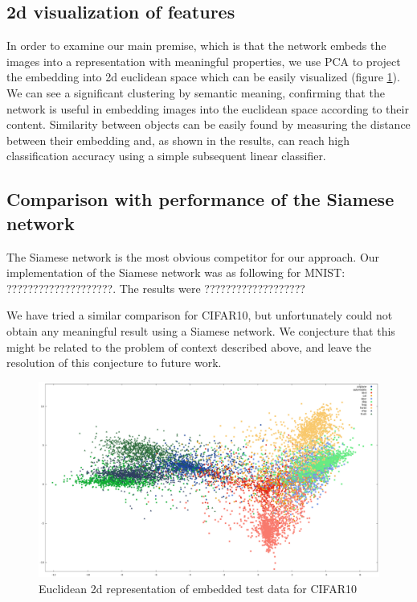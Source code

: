 \documentclass{article} %
\begin{document}
\subsection{2d visualization of features}
In order to examine our main premise, which is that the network embeds the images into a representation with meaningful properties, we
use PCA to project the embedding into 2d euclidean space which can be easily visualized (figure \ref{EuclideanRepresentation}).
We can see a significant clustering by semantic meaning, confirming that the network is useful in embedding
images into the euclidean space according to their content. 
 Similarity between objects can be easily found by  measuring the distance between their embedding and, as shown in the results, can reach high
classification accuracy using a simple subsequent linear classifier. 

\subsection{Comparison with performance of the Siamese network}
The Siamese network is the most obvious competitor for our approach.  Our implementation of the Siamese network was as following for MNIST:    ????????????????????.   The results were ??????????????????? 

We have tried a similar comparison for CIFAR10, but unfortunately could not obtain any meaningful result using a Siamese network.
We conjecture that this might be related to the problem of context described above, and leave the resolution of this 
conjecture to future work.

\begin{figure}[h]
\begin{center}
\includegraphics[width=1\linewidth]{EuclideanRepresentation.eps}
\end{center}
   \caption{Euclidean 2d representation of embedded test data for CIFAR10}\label{EuclideanRepresentation}
\end{figure}
\end{document}
